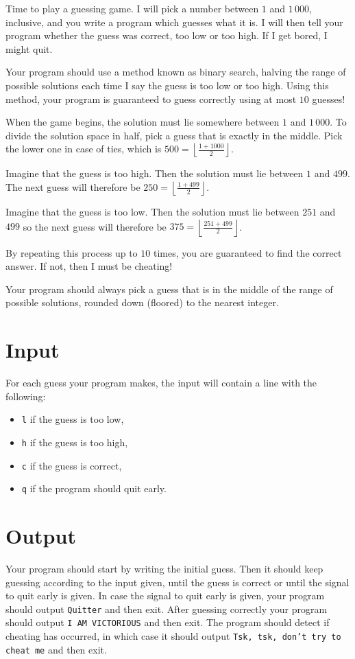 
Time to play a guessing game.
I will pick a number between $1$ and $1\,000$, inclusive, and you write a program which guesses what it is.
I will then tell your program whether the guess was correct, too low or too high.
If I get bored, I might quit.

Your program should use a method known as binary search, halving the range of possible solutions each time I say the guess is too low or too high.
Using this method, your program is guaranteed to guess correctly using at most $10$ guesses!

When the game begins, the solution must lie somewhere between $1$ and $1\,000$.
To divide the solution space in half, pick a guess that is exactly in the middle.
Pick the lower one in case of ties, which is $500 = \left\lfloor \frac{1+1000}{2} \right\rfloor$.

Imagine that the guess is too high.
Then the solution must lie between $1$ and $499$.
The next guess will therefore be $250 = \left\lfloor \frac{1+499}{2} \right\rfloor$.

Imagine that the guess is too low.
Then the solution must lie between $251$ and $499$ so the next guess will therefore be $375 = \left\lfloor \frac{251+499}{2} \right\rfloor$.

By repeating this process up to $10$ times, you are guaranteed to find the correct answer.
If not, then I must be cheating!

Your program should always pick a guess that is in the middle of the range of possible solutions, rounded down (floored) to the nearest integer.

\section*{Input}
For each guess your program makes, the input will contain a line with the following:
\begin{itemize}
    \item \texttt{l} if the guess is too low,
    \item \texttt{h} if the guess is too high,
    \item \texttt{c} if the guess is correct,
    \item \texttt{q} if the program should quit early.
\end{itemize}


\section*{Output}
Your program should start by writing the initial guess.
Then it should keep guessing according to the input given, until the guess is correct or until the signal to quit early is given.
In case the signal to quit early is given, your program should output \texttt{Quitter} and then exit.
After guessing correctly your program should output \texttt{I AM VICTORIOUS} and then exit.
The program should detect if cheating has occurred, in which case it should output \texttt{Tsk, tsk, don't try to cheat me} and then exit.
